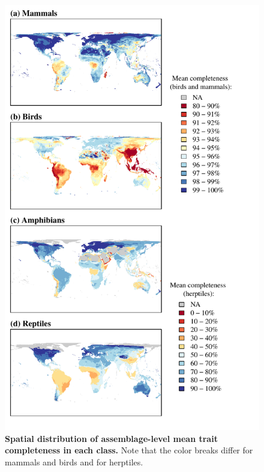 \newpage
\begin{figure}[h!]
\vspace*{-2cm}
\centering
\includegraphics[scale=0.95]{Supporting/Chapter2/Figures/Maps/Mean_map_50k}
\caption[Spatial distribution of assemblage-level mean trait completeness in each class]{\textbf{Spatial distribution of assemblage-level mean trait completeness in each class.} Note that the color breaks differ for mammals and birds and for herptiles.}
\label{SI2_meancomp_spatial}
\end{figure}

